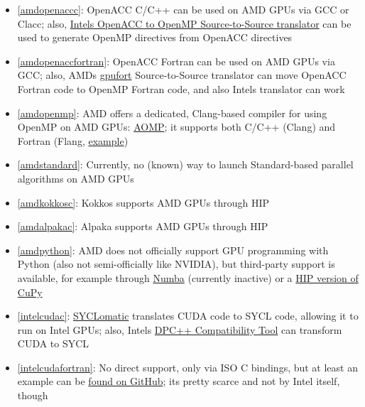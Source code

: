 \begin{frame}[allowframebreaks]
\begin{itemize}
        \item \ref{amdopenaccc}: OpenACC C/C++ can be used on AMD GPUs via GCC or Clacc; also, \href{https://github.com/intel/intel-application-migration-tool-for-openacc-to-openmp}{Intel\textquotesingle s OpenACC to OpenMP Source-to-Source translator} can be used to generate OpenMP directives from OpenACC directives
        \item \ref{amdopenaccfortran}: OpenACC Fortran can be used on AMD GPUs via GCC; also, AMD\textquotesingle s \href{https://github.com/intel/intel-application-migration-tool-for-openacc-to-openmp}{gpufort} Source-to-Source translator can move OpenACC Fortran code to OpenMP Fortran code, and also Intel\textquotesingle s translator can work
        \item \ref{amdopenmp}: AMD offers a dedicated, Clang-based compiler for using OpenMP on AMD GPUs: \href{https://github.com/ROCm-Developer-Tools/aomp}{AOMP}; it supports both C/C++ (Clang) and Fortran (Flang, \href{https://github.com/ROCm-Developer-Tools/aomp/tree/aomp-dev/examples/fortran/simple_offload}{example})
        \item \ref{amdstandard}: Currently, no (known) way to launch Standard-based parallel algorithms on AMD GPUs
        \item \ref{amdkokkosc}: Kokkos supports AMD GPUs through HIP
        \item \ref{amdalpakac}: Alpaka supports AMD GPUs through HIP
        \item \ref{amdpython}: AMD does not officially support GPU programming with Python (also not semi-officially like NVIDIA), but third-party support is available, for example through \href{https://numba.pydata.org/numba-doc/latest/roc/index.html}{Numba} (currently inactive) or a \href{https://docs.cupy.dev/en/latest/install.html?highlight=rocm\#building-cupy-for-rocm-from-source}{HIP version of CuPy}
        \item \ref{intelcudac}: \href{https://github.com/oneapi-src/SYCLomatic}{SYCLomatic} translates CUDA code to SYCL code, allowing it to run on Intel GPUs; also, Intel\textquotesingle s \href{https://www.intel.com/content/www/us/en/developer/tools/oneapi/dpc-compatibility-tool.html}{DPC++ Compatibility Tool} can transform CUDA to SYCL
        \item \ref{intelcudafortran}: No direct support, only via ISO C bindings, but at least an example can be \href{https://github.com/codeplaysoftware/SYCL-For-CUDA-Examples/tree/master/examples/fortran_interface}{found on GitHub}; it\textquotesingle s pretty scarce and not by Intel itself, though

\end{itemize}
\end{frame}

